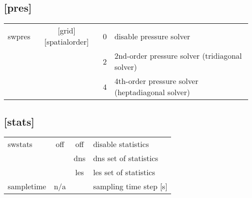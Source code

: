 \documentclass[a4paper,10pt]{extarticle}
\begin{document}
\subsection*{[pres]}
\tablelasttail{\hline}
\begin{supertabular}{lccl}
swpres        & [grid][spatialorder]  & 0 & disable pressure solver \\
              &                       & 2 & 2nd-order pressure solver (tridiagonal solver) \\
              &                       & 4 & 4th-order pressure solver (heptadiagonal solver) \\
\end{supertabular}
\subsection*{[stats]}
\tablelasttail{\hline}
\begin{supertabular}{lccl}
swstats       & off   & off & disable statistics \\
              &       & dns & dns set of statistics \\
              &       & les & les set of statistics \\
sampletime    & n/a   &     & sampling time step [s] \\
\end{supertabular}
\end{document}

